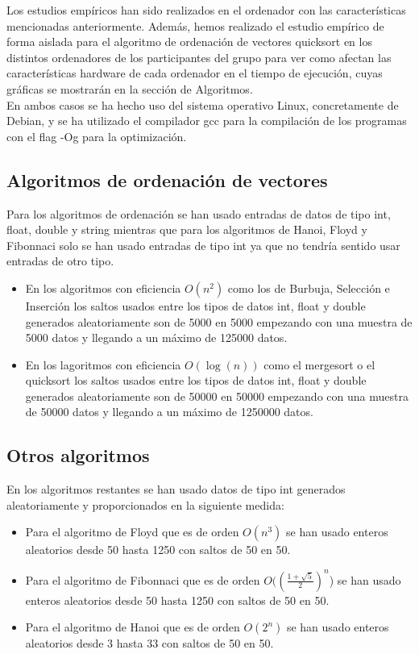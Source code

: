 \documentclass[11pt]{article}
\begin{document}
    Los estudios empíricos han sido realizados en el ordenador con las características mencionadas anteriormente.
    Además, hemos realizado el estudio empírico de forma aislada para el algoritmo de ordenación de vectores
    quicksort en los distintos ordenadores de los participantes del grupo para ver como afectan las características
    hardware de cada ordenador en el tiempo de ejecución, cuyas gráficas se mostrarán en la sección de Algoritmos. \\
    En ambos casos se ha hecho uso del sistema operativo Linux, concretamente de Debian, y se ha utilizado el
    compilador gcc para la compilación de los programas  con el flag -Og para la optimización.
    \subsection{Algoritmos de ordenación de vectores}
    Para los algoritmos de ordenación se han usado entradas de datos de tipo int, float, double y string mientras que para los algoritmos de Hanoi, Floyd  y Fibonnaci solo se han usado entradas de tipo int 
    ya que no tendría sentido usar entradas de otro tipo. 
    \begin{itemize}
        \item En los algoritmos con eficiencia  \(O(n^2)\) como los de Burbuja, Selección e Inserción los saltos usados entre los tipos de datos int, float y double generados aleatoriamente son de 5000 en 5000 empezando con una muestra de 5000 datos y llegando a
        un máximo de 125000 datos.
        \item En los lagoritmos con eficiencia \(O (\log(n))\) como el mergesort o el quicksort los saltos usados entre los tipos de datos int, float y double generados aleatoriamente son de 50000 en 50000 empezando con una muestra de 50000 datos y llegando a
        un máximo de 1250000 datos.
    \end{itemize}

    \subsection{Otros algoritmos}
    En los algoritmos restantes se han usado datos de tipo int generados aleatoriamente y proporcionados en la siguiente medida:
    \begin{itemize}
        \item Para el algoritmo de Floyd  que es de orden \(O(n^3)\) se han usado enteros aleatorios desde 50 hasta 1250 con saltos de 50 en 50.
        \item Para el algoritmo de Fibonnaci  que es de orden \(O((\frac{1+\sqrt{5}}{2})^n\)) se han usado enteros aleatorios desde 50 hasta 1250 con saltos de 50 en 50.
        \item Para el algoritmo de Hanoi que es de orden \(O(2^n)\) se han usado enteros aleatorios desde 3 hasta 33 con saltos de 50 en 50. 
    \end{itemize}
\end{document}
